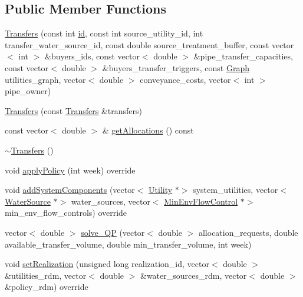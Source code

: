 \subsection*{Public Member Functions}
\begin{DoxyCompactItemize}
\item 
\mbox{\hyperlink{classTransfers_a40555bc28e085d0e119a9f039317c79f}{Transfers}} (const int \mbox{\hyperlink{classDroughtMitigationPolicy_abf3ed19ed98e0d74dc9ae24094be640b}{id}}, const int source\+\_\+utility\+\_\+id, int transfer\+\_\+water\+\_\+source\+\_\+id, const double source\+\_\+treatment\+\_\+buffer, const vector$<$ int $>$ \&buyers\+\_\+ids, const vector$<$ double $>$ \&pipe\+\_\+transfer\+\_\+capacities, const vector$<$ double $>$ \&buyers\+\_\+transfer\+\_\+triggers, const \mbox{\hyperlink{classGraph}{Graph}} utilities\+\_\+graph, vector$<$ double $>$ conveyance\+\_\+costs, vector$<$ int $>$ pipe\+\_\+owner)
\item 
\mbox{\hyperlink{classTransfers_af88f7908692240eec9f3179128c6f343}{Transfers}} (const \mbox{\hyperlink{classTransfers}{Transfers}} \&transfers)
\item 
const vector$<$ double $>$ \& \mbox{\hyperlink{classTransfers_a6c687c9f767ea915eead1f5db18711a2}{get\+Allocations}} () const
\item 
\mbox{\hyperlink{classTransfers_a5dfeafe7a9b9a446b1ab746b65ef3b4b}{$\sim$\+Transfers}} ()
\item 
void \mbox{\hyperlink{classTransfers_ad9e4e83ff763ac1ba518a19051cd2e69}{apply\+Policy}} (int week) override
\item 
void \mbox{\hyperlink{classTransfers_a3c1930dbeb1273c1c0be93ad5ca57357}{add\+System\+Components}} (vector$<$ \mbox{\hyperlink{classUtility}{Utility}} $\ast$$>$ system\+\_\+utilities, vector$<$ \mbox{\hyperlink{classWaterSource}{Water\+Source}} $\ast$$>$ water\+\_\+sources, vector$<$ \mbox{\hyperlink{classMinEnvFlowControl}{Min\+Env\+Flow\+Control}} $\ast$$>$ min\+\_\+env\+\_\+flow\+\_\+controls) override
\item 
vector$<$ double $>$ \mbox{\hyperlink{classTransfers_a156baa248ab355c895a0a2f9e5f2742a}{solve\+\_\+\+QP}} (vector$<$ double $>$ allocation\+\_\+requests, double available\+\_\+transfer\+\_\+volume, double min\+\_\+transfer\+\_\+volume, int week)
\item 
void \mbox{\hyperlink{classTransfers_a75342a7c14b2ff69eb2520de240a1131}{set\+Realization}} (unsigned long realization\+\_\+id, vector$<$ double $>$ \&utilities\+\_\+rdm, vector$<$ double $>$ \&water\+\_\+sources\+\_\+rdm, vector$<$ double $>$ \&policy\+\_\+rdm) override
\end{DoxyCompactItemize}
